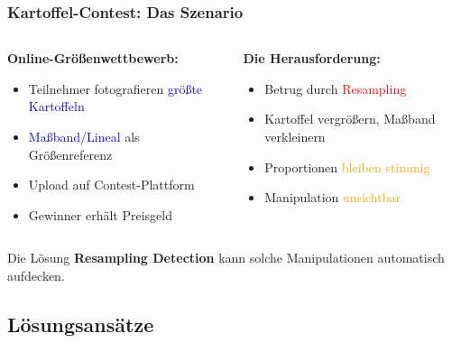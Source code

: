 \documentclass[11pt,t,usepdftitle=false,aspectratio=169]{beamer}
\begin{document}
\begin{frame}
	\frametitle{Kartoffel-Contest: Das Szenario}
	\begin{columns}[T]
		\begin{column}{0.48\textwidth}
			\textbf{Online-Größenwettbewerb:}
			\begin{itemize}
				\item Teilnehmer fotografieren \textcolor{blue}{größte Kartoffeln}
				\item \textcolor{blue}{Maßband/Lineal} als Größenreferenz
				\item Upload auf Contest-Plattform
				\item Gewinner erhält Preisgeld
			\end{itemize}
		\end{column}
		\begin{column}{0.48\textwidth}
			\textbf{Die Herausforderung:}
			\begin{itemize}
				\item Betrug durch \textcolor{red}{Resampling}
				\item Kartoffel vergrößern, Maßband verkleinern
				\item Proportionen \textcolor{orange}{bleiben stimmig}
				\item Manipulation \textcolor{orange}{unsichtbar}
			\end{itemize}
		\end{column}
	\end{columns}
	
	\vspace{1.5em}
	\begin{alertblock}{Die Lösung}
		\textbf{Resampling Detection} kann solche Manipulationen automatisch aufdecken.
	\end{alertblock}
\end{frame}


\subsection{Lösungsansätze}
\end{document}
